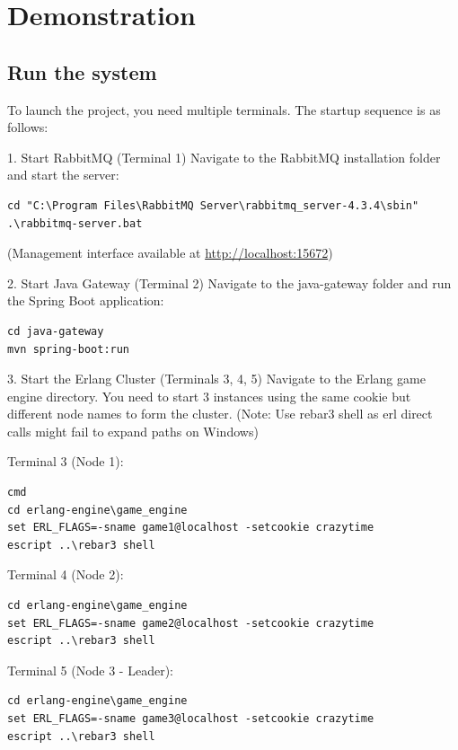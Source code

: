 \documentclass[12pt,a4paper]{article}
\begin{document}
\section{Demonstration}

\subsection{Run the system}
To launch the project, you need multiple terminals. The startup sequence is as follows:

1. Start RabbitMQ (Terminal 1) Navigate to the RabbitMQ installation folder and start the server:

\begin{verbatim}
cd "C:\Program Files\RabbitMQ Server\rabbitmq_server-4.3.4\sbin"
.\rabbitmq-server.bat
\end{verbatim}
(Management interface available at \url{http://localhost:15672})

2. Start Java Gateway (Terminal 2) Navigate to the java-gateway folder and run the Spring Boot application:

\begin{verbatim}
cd java-gateway
mvn spring-boot:run
\end{verbatim}

3. Start the Erlang Cluster (Terminals 3, 4, 5) Navigate to the Erlang game engine directory. You need to start 3 instances using the same cookie but different node names to form the cluster. (Note: Use rebar3 shell as erl direct calls might fail to expand paths on Windows)

Terminal 3 (Node 1):

\begin{verbatim}
cmd
cd erlang-engine\game_engine
set ERL_FLAGS=-sname game1@localhost -setcookie crazytime
escript ..\rebar3 shell
\end{verbatim}

Terminal 4 (Node 2):

\begin{verbatim}
cd erlang-engine\game_engine
set ERL_FLAGS=-sname game2@localhost -setcookie crazytime
escript ..\rebar3 shell
\end{verbatim}

Terminal 5 (Node 3 - Leader):

\begin{verbatim}
cd erlang-engine\game_engine
set ERL_FLAGS=-sname game3@localhost -setcookie crazytime
escript ..\rebar3 shell
\end{verbatim}
\end{document}
